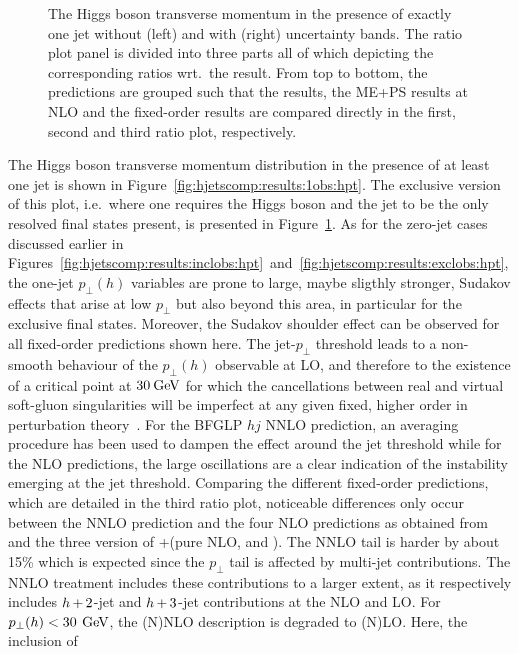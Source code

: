 \begin{figure}[t!]
  \caption{\label{fig:hjetscomp:results:1obs:hpt_excl}%
    The Higgs boson transverse momentum in the presence of exactly one
    jet without (left) and with (right) uncertainty bands. The ratio
    plot panel is divided into three parts all of which depicting the
    corresponding ratios wrt.~the \Powheg \NNLOPS result. From top to
    bottom, the predictions are grouped such that the \NNLOPS results,
    the ME+PS results at NLO and the fixed-order results are compared
    directly in the first, second and third ratio plot, respectively.}
\end{figure}

The Higgs boson transverse momentum distribution in the presence of at
least one jet is shown in
Figure~\ref{fig:hjetscomp:results:1obs:hpt}. The exclusive version of
this plot, i.e.~where one requires the Higgs boson and the jet to be 
the only resolved final states present,
is presented in Figure~\ref{fig:hjetscomp:results:1obs:hpt_excl}.  As
for the zero-jet cases discussed earlier in
Figures~\ref{fig:hjetscomp:results:inclobs:hpt}~and~\ref{fig:hjetscomp:results:exclobs:hpt},
the one-jet $p_\perp(h)$ variables are prone to large, maybe sligthly
stronger, Sudakov effects that arise at low $p_\perp$ but also beyond
this area, in particular for the exclusive final states. Moreover, the
Sudakov shoulder effect can be observed for all fixed-order
predictions shown here. The jet-$p_\perp$ threshold leads to a
non-smooth behaviour of the $p_\perp(h)$ observable at LO, and
therefore to the existence of a critical point at $30\text{\:GeV}$ for which
the cancellations between real and virtual soft-gluon singularities
will be imperfect at any given fixed, higher order in perturbation
theory~\cite{Catani:1997xc}. For the BFGLP $hj$ NNLO  prediction, an
averaging procedure has been used to dampen the effect around the jet
threshold while for the NLO predictions, the large oscillations are a
clear indication of the instability emerging at the jet threshold.
Comparing the different fixed-order predictions, which are detailed in 
the third ratio plot, noticeable differences only
occur between the NNLO prediction and the four NLO predictions as
obtained from \Powheg and the three version of \GoSam+\Sherpa (pure
NLO, \Minlo and \Loopsim). The NNLO tail is harder by about 15\% which
is expected since the $p_\perp$ tail is affected by multi-jet
contributions. The NNLO treatment includes these contributions to a
larger extent, as it respectively includes $h\!\text{~+~}\!2$-jet and
$h\!\text{~+~}\!3$-jet contributions at the NLO and LO. For $p_\perp(h)< 30\,\text{\:GeV}$, 
the (N)NLO description is degraded to (N)LO. Here, the inclusion of 
